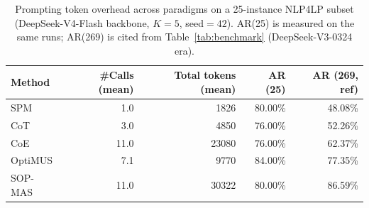 \begin{table}[htbp]
\centering
\caption{Prompting token overhead across paradigms on a 25-instance NLP4LP subset (DeepSeek-V4-Flash backbone, $K{=}5$, seed${=}42$). AR(25) is measured on the same runs; AR(269) is cited from Table~\ref{tab:benchmark} (DeepSeek-V3-0324 era).}\label{tab:token_overhead}
\begin{tabular}{lrrrr}
\toprule
Method & \#Calls (mean) & Total tokens (mean) & AR (25) & AR (269, ref) \\
\midrule
SPM & 1.0 & 1826 & 80.00\% & 48.08\% \\
CoT & 3.0 & 4850 & 76.00\% & 52.26\% \\
CoE & 11.0 & 23080 & 76.00\% & 62.37\% \\
OptiMUS & 7.1 & 9770 & 84.00\% & 77.35\% \\
SOP-MAS & 11.0 & 30322 & 80.00\% & 86.59\% \\
\bottomrule
\end{tabular}
\end{table}
